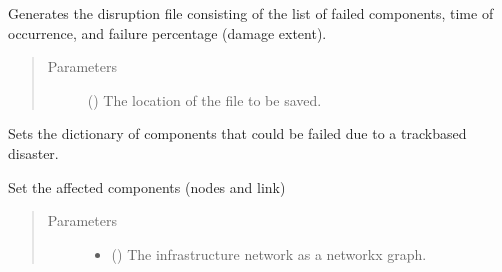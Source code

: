 \documentclass[letterpaper,10pt,english]{sphinxmanual}
\begin{document}
\begin{fulllineitems}
\begin{fulllineitems}
\label{\detokenize{apidoc:dreaminsg_integrated_model.src.hazard_initiator.TrackDisruption.generate_disruption_file}}
\sphinxAtStartPar
Generates the disruption file consisting of the list of failed components, time of occurrence, and failure percentage (damage extent).
\begin{quote}\begin{description}
\item[{Parameters}] \leavevmode
\sphinxAtStartPar
{} () \textendash{} The location of the file to be saved.

\end{description}\end{quote}

\end{fulllineitems}


\begin{fulllineitems}
\label{\detokenize{apidoc:dreaminsg_integrated_model.src.hazard_initiator.TrackDisruption.get_fail_compon_dict}}
\sphinxAtStartPar
Sets the dictionary of components that could be failed due to a track\sphinxhyphen{}based disaster.

\end{fulllineitems}


\begin{fulllineitems}
\label{\detokenize{apidoc:dreaminsg_integrated_model.src.hazard_initiator.TrackDisruption.set_affected_components}}
\sphinxAtStartPar
Set the affected components (nodes and link)
\begin{quote}\begin{description}
\item[{Parameters}] \leavevmode\begin{itemize}
\item {} 
\sphinxAtStartPar
{} () \textendash{} The infrastructure network as a networkx graph.


\end{itemize}
\end{description}
\end{quote}
\end{fulllineitems}
\end{fulllineitems}
\end{document}
